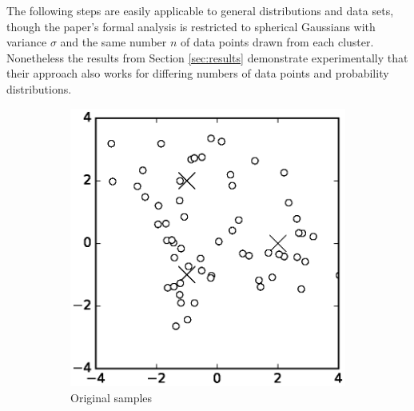 \documentclass[10pt,a4paper]{article}
\begin{document}
The following steps are easily applicable to general distributions and data sets, though the paper's formal analysis is restricted to spherical Gaussians with variance $\sigma$ and the same number $n$ of data points drawn from each cluster.
Nonetheless the results from Section \ref{sec:results} demonstrate experimentally that their approach also works for differing numbers of data points and probability distributions.

\begin{figure}[h!]
  \centering
  \begin{subfigure}{0.3\textwidth}
    \centering
    \includegraphics[width=\textwidth]{figures/denoising-noisy}
    \caption{Original samples}
    \label{fig:noisy}
  \end{subfigure}
  \hspace{1cm}
  \begin{subfigure}{0.3\textwidth}
    \centering

\end{subfigure}
\end{figure}
\end{document}
